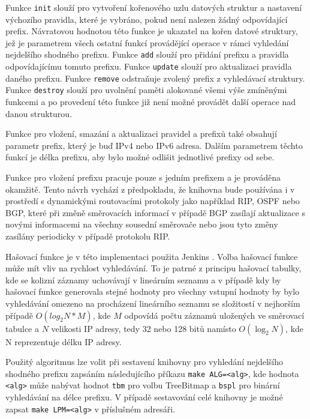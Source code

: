 Funkce \texttt{init} slouží pro vytvoření kořenového uzlu datových struktur a
nastavení výchozího pravidla, které je vybráno, pokud není nalezen žádný odpovídající prefix.
Návratovou hodnotou této funkce je ukazatel na kořen datové struktury, jež je parametrem
všech ostatní funkcí provádějící operace v rámci vyhledání nejdelšího shodného prefixu.
Funkce \texttt{add} slouží pro přidání prefixu a pravidla odpovídajícímu tomuto prefixu.
Funkce \texttt{update} slouží pro aktualizaci pravidla daného prefixu.
Funkce \texttt{remove} odstraňuje zvolený prefix z vyhledávací struktury.
Funkce \texttt{destroy} slouží pro uvolnění paměti alokované všemi výše zmíněnými funkcemi
a po provedení této funkce již není možné provádět další operace nad danou strukturou.

Funkce pro vložení, smazání a aktualizaci pravidel a prefixů také obsahují parametr
prefix, který je buď IPv4 nebo IPv6 adresa. Dalším parametrem těchto funkcí je délka prefixu,
aby bylo možné odlišit jednotlivé prefixy od sebe.

Funkce pro vložení prefixu pracuje pouze s jedním prefixem a je prováděna okamžitě.
Tento návrh vychází z předpokladu, že knihovna bude používána i v prostředí s dynamickými routovacími
protokoly jako například RIP, OSPF nebo BGP, které při změně směrovacích informací v případě BGP
zasílají aktualizace s novými informacemi na všechny sousední směrovače nebo jsou tyto změny
zasílány periodicky v případě protokolu RIP.

Hašovací funkce je v této implementaci použita Jenkins \cite{jenkins}. Volba hašovací funkce
může mít vliv na rychlost vyhledávání. To je patrné z principu hašovací tabulky, kde se
kolizní záznamy uchovávají v lineárním seznamu a v případě kdy by hašovací funkce generovala
stejné hodnoty pro všechny vstupní hodnoty by bylo vyhledávání omezeno na procházení
lineárního seznamu se složitostí v nejhorším případě $O(log_2{N}*M)$, kde $M$ odpovídá počtu záznamů uložených ve směrovací tabulce a $N$ velikosti IP adresy, tedy 32 nebo 128 bitů
namísto $O(\log_2{N})$, kde N reprezentuje délku IP adresy.

Použitý algoritmus lze volit při sestavení knihovny pro vyhledání nejdelšího shodného prefixu
zapsáním následujícího příkazu \texttt{make ALG=<alg>}, kde hodnota \texttt{<alg>} může nabývat
hodnot \texttt{tbm} pro volbu TreeBitmap a \texttt{bspl} pro binární vyhledávání na délce prefixu.
V případě sestavování celé knihovny je možné zapsat \texttt{make LPM=<alg>} v příslušném adresáři.

